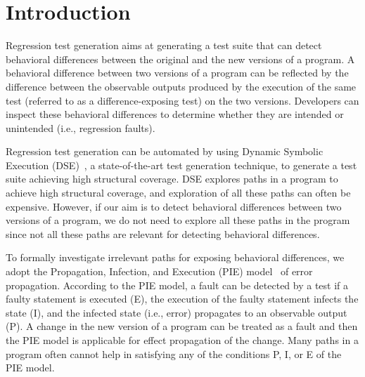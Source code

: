 
\section{Introduction}
\label{sec:intro}
Regression test generation aims at generating a test suite that can detect behavioral differences between the original and the new versions of a program. A behavioral difference between two versions of a program can be reflected by the difference between the observable outputs produced by the execution of the same test (referred to as a difference-exposing test) on the two versions. Developers can inspect these behavioral differences to determine whether they are intended or unintended (i.e., regression faults).

Regression test generation can be automated by using Dynamic Symbolic
Execution (DSE)~\cite{dart, cute, exe}, a state-of-the-art test generation
technique, to generate a test suite achieving high
structural coverage. DSE explores paths in a program to
achieve high structural coverage, and exploration of all
these paths can often be expensive. However, if our aim is
to detect behavioral differences between two versions of a
program, we do not need to explore all these paths in the program
since not all these paths are relevant for detecting behavioral
differences.

To formally investigate irrelevant paths for exposing behavioral differences, we adopt the 
Propagation, Infection, and Execution (PIE) model~\cite{voas} of error propagation. According to the PIE model, a fault can be detected by a test if a faulty statement is executed (E), the execution of the faulty statement infects the state (I), and the infected state (i.e., error) propagates to an observable output (P). A change in the new version of a program can be treated as a fault and then the PIE model is applicable for effect propagation of the change. Many paths in a program often cannot help in satisfying any of the conditions P, I, or E of the PIE model. 

